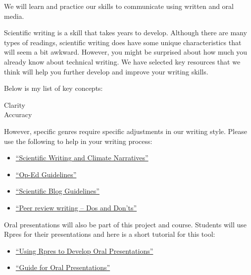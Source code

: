 \documentclass{article}\usepackage[]{graphicx}\usepackage[]{color}
\begin{document}
We will learn and practice our skills to communicate using written and oral media. 

Scientific writing is a skill that takes years to develop. Although there are many types of readings, scientific writing does have some unique characteristics that will seem a bit awkward. However, you might be surprised about how much you already know about technical writing. We have selected key resources that we think will help you further develop and improve your writing skills.

Below is my list of key concepts:

\begin{description}
  \item[Clarity]
  \item[Accuracy]
\end{description}


However, specific genres require specific adjustments in our writing style. Please use the following to help in your writing process:

\begin{itemize}
  \item \href{https://github.com/marclos/Climate_Change_Narratives/raw/master/Writing_Resources/Writing_About_Climate.pdf}{``Scientific Writing and Climate Narratives''}

  \item \href{https://github.com/marclos/Climate_Change_Narratives/raw/master/Writing_Resources/Op-Ed_Guidelines.pdf}{``Op-Ed Guidelines''}
  \item \href{https://github.com/marclos/Climate_Change_Narratives/raw/master/Writing_Resources/Scientific_Blog_Guidelines.pdf}{``Scientific Blog Guidelines''}
  \item \href{https://github.com/marclos/Climate_Change_Narratives/raw/master/Writing_Resources/Peer_Review-Dos_and_Donts.pdf}{``Peer review writing -- Dos and Don'ts''}
\end{itemize}

Oral presentations will also be part of this project and course. Students will use Rpres for their presentations and here is a short tutorial for this tool:

\begin{itemize}
  \item \href{https://github.com/marclos/Climate_Change_Narratives/raw/master/Writing_Resources/TBD.pdf}{``Using Rpres to Develop Oral Presentations''}
  \item \href{https://github.com/marclos/Climate_Change_Narratives/raw/master/Writing_Resources/TBD.pdf}{``Guide for Oral Presentations''}
\end{itemize}
\end{document}
